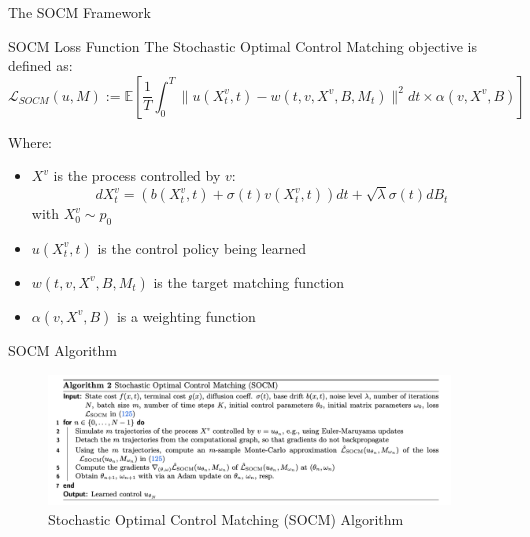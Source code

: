 \documentclass[aspectratio=169,xcolor=dvipsnames]{beamer}
\begin{document}
\begin{frame}{The SOCM Framework}
    \small
    \begin{block}{SOCM Loss Function}
        The Stochastic Optimal Control Matching objective is defined as:
        \begin{equation}
        \mathcal{L}_{SOCM}(u, M) := \mathbb{E}\left[\frac{1}{T}\int_0^T \|u(X^v_t, t) - w(t, v, X^v, B, M_t)\|^2 dt \times \alpha(v, X^v, B)\right]
        \end{equation}
    \end{block}

    \begin{block}{Where:}
        \begin{itemize}
            \item $X^v$ is the process controlled by $v$: 
            \begin{equation}
            dX^v_t = (b(X^v_t, t) + \sigma(t)v(X^v_t, t)) dt + \sqrt{\lambda}\sigma(t) dB_t
            \end{equation}
            with $X^v_0 \sim p_0$
            \item $u(X^v_t, t)$ is the control policy being learned
            \item $w(t, v, X^v, B, M_t)$ is the target matching function
            \item $\alpha(v, X^v, B)$ is a weighting function
        \end{itemize}
    \end{block}
\end{frame}

\begin{frame}{SOCM Algorithm}
    \begin{figure}
        \centering
        \includegraphics[width=0.95\textwidth]{figures/SOCM_algo.png}
        \caption{Stochastic Optimal Control Matching (SOCM) Algorithm}
    \end{figure}
\end{frame}
\end{document}
